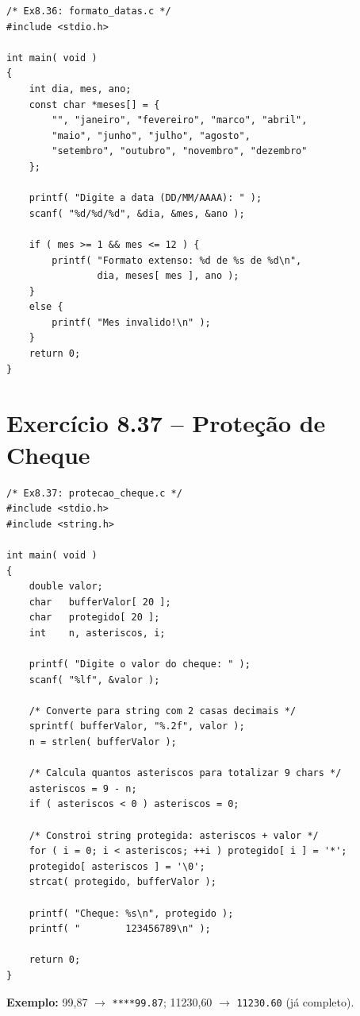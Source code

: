 \documentclass[12pt,a4paper]{article}
\begin{document}
\begin{respostabox}
\begin{lstlisting}
/* Ex8.36: formato_datas.c */
#include <stdio.h>

int main( void )
{
    int dia, mes, ano;
    const char *meses[] = {
        "", "janeiro", "fevereiro", "marco", "abril",
        "maio", "junho", "julho", "agosto",
        "setembro", "outubro", "novembro", "dezembro"
    };

    printf( "Digite a data (DD/MM/AAAA): " );
    scanf( "%d/%d/%d", &dia, &mes, &ano );

    if ( mes >= 1 && mes <= 12 ) {
        printf( "Formato extenso: %d de %s de %d\n",
                dia, meses[ mes ], ano );
    }
    else {
        printf( "Mes invalido!\n" );
    }
    return 0;
}
\end{lstlisting}
\end{respostabox}

\newpage

\section{Exercício 8.37 -- Proteção de Cheque}

\begin{respostabox}
\begin{lstlisting}
/* Ex8.37: protecao_cheque.c */
#include <stdio.h>
#include <string.h>

int main( void )
{
    double valor;
    char   bufferValor[ 20 ];
    char   protegido[ 20 ];
    int    n, asteriscos, i;

    printf( "Digite o valor do cheque: " );
    scanf( "%lf", &valor );

    /* Converte para string com 2 casas decimais */
    sprintf( bufferValor, "%.2f", valor );
    n = strlen( bufferValor );

    /* Calcula quantos asteriscos para totalizar 9 chars */
    asteriscos = 9 - n;
    if ( asteriscos < 0 ) asteriscos = 0;

    /* Constroi string protegida: asteriscos + valor */
    for ( i = 0; i < asteriscos; ++i ) protegido[ i ] = '*';
    protegido[ asteriscos ] = '\0';
    strcat( protegido, bufferValor );

    printf( "Cheque: %s\n", protegido );
    printf( "        123456789\n" );

    return 0;
}
\end{lstlisting}

\textbf{Exemplo:} 99{,}87 $\to$ \texttt{****99.87}; 11230{,}60 $\to$ \texttt{11230.60} (já completo).
\end{respostabox}
\end{document}
